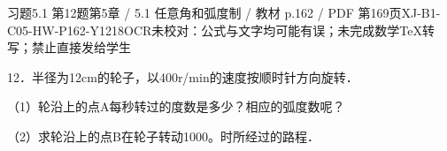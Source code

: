 \begin{bankitem}{习题5.1 第12题}{第5章 / 5.1 任意角和弧度制 / 教材 p.162 / PDF 第169页}{XJ-B1-C05-HW-P162-Y1218}{OCR未校对：公式与文字均可能有误；未完成数学TeX转写；禁止直接发给学生}
\begin{ocrdraft}
\par
12．半径为12cm的轮子，以400r/min的速度按顺时针方向旋转．
\par
（1）轮沿上的点A每秒转过的度数是多少？相应的弧度数呢？
\par
（2）求轮沿上的点B在轮子转动1000。时所经过的路程．
\end{ocrdraft}
\end{bankitem}
